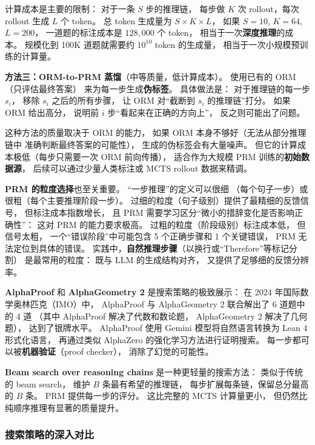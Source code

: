 计算成本是主要的限制：
对于一条 $S$ 步的推理链，
每步做 $K$ 次 rollout，每次 rollout 生成 $L$ 个 token。
总 token 生成量为 $S \times K \times L$，
如果 $S = 10$, $K = 64$, $L = 200$，
一道题的标注成本是 $128,000$ 个 token，
相当于一次\textbf{深度推理}的成本。
规模化到 100K 道题就需要约 $10^{10}$ token 的生成量，
相当于一次小规模预训练的计算量。

\textbf{方法三：ORM-to-PRM 蒸馏}（中等质量，低计算成本）。
使用已有的 ORM（只评估最终答案）
来为每一步生成\textbf{伪标签}。
具体做法是：
对于推理链的每一步 $s_i$，
移除 $s_i$ 之后的所有步骤，
让 ORM 对“截断到 $s_i$ 的推理链”打分。
如果 ORM 给出高分，
说明前 $i$ 步“看起来在正确的方向上”，
反之则可能出了问题。

这种方法的质量取决于 ORM 的能力，
如果 ORM 本身不够好（无法从部分推理链中
准确判断最终答案的可能性），
生成的伪标签会有大量噪声。
但它的计算成本极低（每步只需要一次 ORM 前向传播），
适合作为大规模 PRM 训练的\textbf{初始数据源}，
后续可以通过少量人类标注或 MCTS rollout 数据来精调。

\textbf{PRM 的粒度选择}也至关重要。
“一步推理”的定义可以很细
（每个句子一步）或很粗（每个主要推理阶段一步）。
过细的粒度（句子级别）提供了最精细的反馈信号，
但标注成本指数增长，
且 PRM 需要学习区分“微小的措辞变化是否影响正确性”：
这对 PRM 的能力要求极高。
过粗的粒度（阶段级别）标注成本低，
但信号太粗，
一个“错误阶段”中可能包含 5 个正确步骤和 1 个关键错误，
PRM 无法定位到具体的错误。
实践中，\textbf{自然推理步骤}（以换行或“Therefore”等标记分割）
是最常用的粒度：
既与 LLM 的生成结构对齐，
又提供了足够细的反馈分辨率。

\textbf{AlphaProof} 和 \textbf{AlphaGeometry 2}
是搜索策略的极致展示：
在 2024 年国际数学奥林匹克（IMO）中，
AlphaProof 与 AlphaGeometry 2 联合解出了 6 道题中的 4 道
（其中 AlphaProof 解决了代数和数论题，
AlphaGeometry 2 解决了几何题），
达到了银牌水平。
AlphaProof 使用 Gemini 模型将自然语言转换为 Lean 4 形式化语言，
再通过类似 AlphaZero 的强化学习方法进行证明搜索。
每一步都可以被\textbf{机器验证}（proof checker），
消除了幻觉的可能性。

\textbf{Beam search over reasoning chains}
是一种更轻量的搜索方法：
类似于传统的 beam search，
维护 $B$ 条最有希望的推理链，
每步扩展每条链，保留总分最高的 $B$ 条。
PRM 提供每一步的评分。
这比完整的 MCTS 计算量更小，
但仍然比纯顺序推理有显著的质量提升。

\subsubsection{搜索策略的深入对比}

